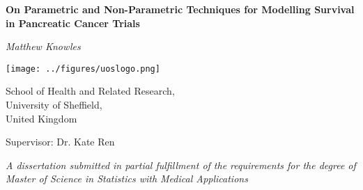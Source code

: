 \begin{titlepage}

    \begin{center}

        \vspace*{1.5cm}

        \textbf{\huge On Parametric and Non-Parametric Techniques for Modelling Survival in Pancreatic Cancer Trials} 
        
        \vspace*{1.5cm}
        
        \textit{Matthew Knowles}

        \vspace*{1.5cm}
    
        \texttt{[image: ../figures/uoslogo.png]}
        
        \vspace*{1.5cm}
        
        School of Health and Related Research, \\
        University of Sheffield, \\
        United Kingdom \\

        \vspace*{0.5cm}

        Supervisor: Dr. Kate Ren
        
        \vspace*{1.5cm}

        \textit{A dissertation submitted in partial fulfillment of the requirements for the degree of Master of Science in 
        Statistics with Medical Applications}
    \end{center}
    
\end{titlepage}
